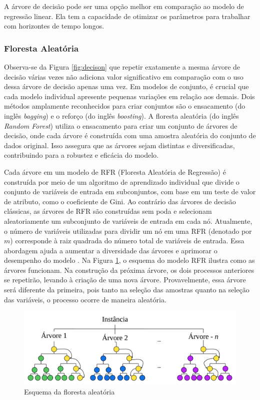  
 
 A árvore de decisão pode ser uma opção melhor em comparação ao modelo de regressão linear. Ela tem a capacidade de otimizar os parâmetros para trabalhar com horizontes de tempo longos.
 
 \subsubsection{Floresta Aleat\'oria } \label{subsubsec:rf}
 
 Observa-se da Figura \ref{fig:decison} que repetir exatamente a mesma árvore de decisão várias vezes não adiciona valor significativo em comparação com o uso dessa árvore de decisão apenas uma vez. Em modelos de conjunto, é crucial que cada modelo individual apresente pequenas variações em relação aos demais. Dois métodos amplamente reconhecidos para criar conjuntos são o ensacamento (do inglês \textit{bagging}) e o reforço (do inglês \textit{boosting}). A floresta aleatória (do inglês \textit{Random Forest}) utiliza o ensacamento para criar um conjunto de árvores de decisão, onde cada árvore é construída com uma amostra aleatória do conjunto de dados original. Isso assegura que as árvores sejam distintas e diversificadas, contribuindo para a robustez e eficácia do modelo.
 
 Cada árvore em um modelo de RFR (Floresta Aleatória de Regressão)  é construída por meio de um algoritmo de aprendizado individual que divide o conjunto de variáveis de entrada em subconjuntos, com base em um teste de valor de atributo, como o coeficiente de Gini. Ao contrário das árvores de decisão clássicas, as árvores de RFR são construídas sem poda e selecionam aleatoriamente um subconjunto de variáveis de entrada em cada nó. Atualmente, o número de variáveis utilizadas para dividir um nó em uma RFR (denotado por $m$) corresponde à raiz quadrada do número total de variáveis de entrada. Essa abordagem ajuda a aumentar a diversidade das árvores e aprimorar o desempenho do modelo \cite{Pelletier2016156}. Na Figura \ref{fig:rf}, o esquema do modelo RFR ilustra como as árvores funcionam.
 Na construção da próxima árvore, os dois processos anteriores se repetirão, levando à criação de uma nova árvore. Provavelmente, essa árvore será diferente da primeira, pois tanto na seleção das amostras quanto na seleção das variáveis, o processo ocorre de maneira aleatória.
 
 
 \begin{figure}[H]
 	\centering
 	\caption{Esquema da floresta aleatória}
 	\label{fig:rf}
 	\includegraphics[width=\linewidth]{Modelos/Figuras/RF}
 	
 	
 \end{figure}
 
